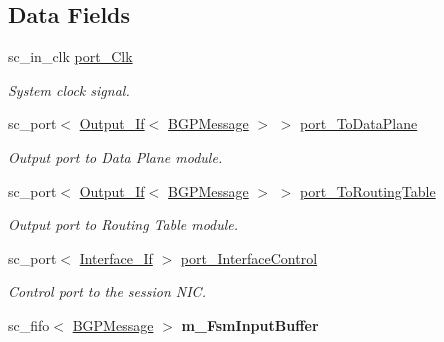 \subsection*{Data Fields}
\begin{DoxyCompactItemize}
\item 
sc\-\_\-in\-\_\-clk \hyperlink{classBGPSession_adf7b7904c73267f2e6499ec4ffddee0e}{port\-\_\-\-Clk}
\begin{DoxyCompactList}\small\item\em System clock signal. \end{DoxyCompactList}\item 
sc\-\_\-port$<$ \hyperlink{classOutput__If}{Output\-\_\-\-If}$<$ \hyperlink{classBGPMessage}{B\-G\-P\-Message} $>$ $>$ \hyperlink{classBGPSession_ad7689f7d5de2710e4d9803de7e274517}{port\-\_\-\-To\-Data\-Plane}
\begin{DoxyCompactList}\small\item\em Output port to Data Plane module. \end{DoxyCompactList}\item 
\hypertarget{classBGPSession_a32b5d9138c0c9eb611e07f642b8397fc}{sc\-\_\-port$<$ \hyperlink{classOutput__If}{Output\-\_\-\-If}$<$ \hyperlink{classBGPMessage}{B\-G\-P\-Message} $>$ $>$ \hyperlink{classBGPSession_a32b5d9138c0c9eb611e07f642b8397fc}{port\-\_\-\-To\-Routing\-Table}}\label{classBGPSession_a32b5d9138c0c9eb611e07f642b8397fc}

\begin{DoxyCompactList}\small\item\em Output port to Routing Table module. \end{DoxyCompactList}\item 
\hypertarget{classBGPSession_ac99274e961eb825ba3d4b61b52d242f4}{sc\-\_\-port$<$ \hyperlink{classInterface__If}{Interface\-\_\-\-If} $>$ \hyperlink{classBGPSession_ac99274e961eb825ba3d4b61b52d242f4}{port\-\_\-\-Interface\-Control}}\label{classBGPSession_ac99274e961eb825ba3d4b61b52d242f4}

\begin{DoxyCompactList}\small\item\em Control port to the session N\-I\-C. \end{DoxyCompactList}\item 
\hypertarget{classBGPSession_aac10fc66e70f5f0a42602b909f29adc9}{sc\-\_\-fifo$<$ \hyperlink{classBGPMessage}{B\-G\-P\-Message} $>$ {\bfseries m\-\_\-\-Fsm\-Input\-Buffer}}\label{classBGPSession_aac10fc66e70f5f0a42602b909f29adc9}

\end{DoxyCompactItemize}


